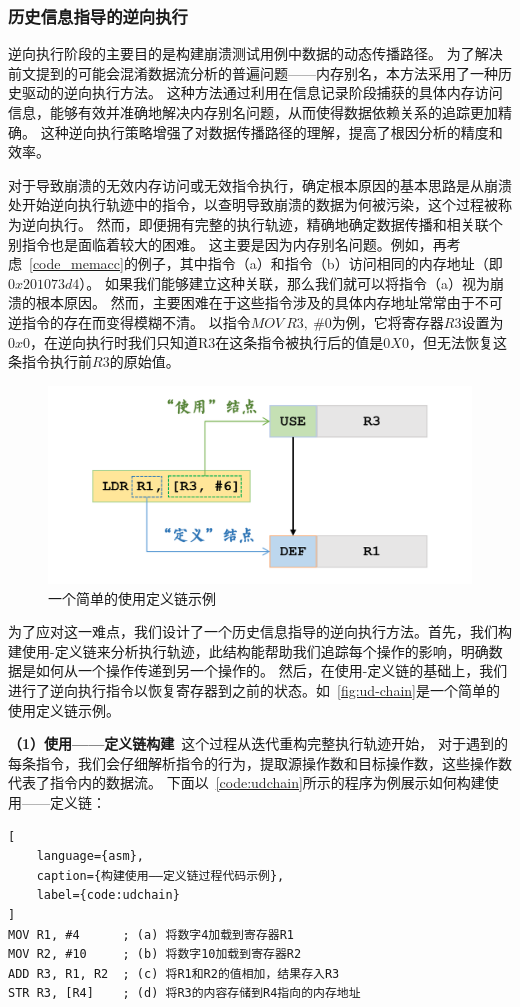 \subsubsection{历史信息指导的逆向执行}
逆向执行阶段的主要目的是构建崩溃测试用例中数据的动态传播路径。
为了解决前文提到的可能会混淆数据流分析的普遍问题——内存别名，本方法采用了一种历史驱动的逆向执行方法。
这种方法通过利用在信息记录阶段捕获的具体内存访问信息，能够有效并准确地解决内存别名问题，从而使得数据依赖关系的追踪更加精确。
这种逆向执行策略增强了对数据传播路径的理解，提高了根因分析的精度和效率。

对于导致崩溃的无效内存访问或无效指令执行，确定根本原因的基本思路是从崩溃处开始逆向执行轨迹中的指令，以查明导致崩溃的数据为何被污染，这个过程被称为逆向执行。
然而，即便拥有完整的执行轨迹，精确地确定数据传播和相关联个别指令也是面临着较大的困难。
这主要是因为内存别名问题。例如，再考虑~\autoref{code_memacc}的例子，其中指令（a）和指令（b）访问相同的内存地址（即$0x201073d4$）。
如果我们能够建立这种关联，那么我们就可以将指令（a）视为崩溃的根本原因。
然而，主要困难在于这些指令涉及的具体内存地址常常由于不可逆指令的存在而变得模糊不清。
以指令$MOV\ R3,\ \#0$为例，它将寄存器$R3$设置为$0x0$，在逆向执行时我们只知道R3在这条指令被执行后的值是$0X0$，但无法恢复这条指令执行前$R3$的原始值。

\begin{figure}[h]
    \centering
    \includegraphics[width=1.0\textwidth]{./figure/UD-Chain.png}
    \caption{一个简单的使用定义链示例}
    \label{fig:ud-chain}
\end{figure}

为了应对这一难点，我们设计了一个历史信息指导的逆向执行方法。首先，我们构建使用-定义链来分析执行轨迹，此结构能帮助我们追踪每个操作的影响，明确数据是如何从一个操作传递到另一个操作的。
然后，在使用-定义链的基础上，我们进行了逆向执行指令以恢复寄存器到之前的状态。如~\autoref{fig:ud-chain}是一个简单的使用定义链示例。

\textbf{（1）使用——定义链构建}\ 这个过程从迭代重构完整执行轨迹开始，
对于遇到的每条指令，我们会仔细解析指令的行为，提取源操作数和目标操作数，这些操作数代表了指令内的数据流。
下面以~\autoref{code:udchain}所示的程序为例展示如何构建使用——定义链：
\begin{lstlisting}[
    language={asm},
    caption={构建使用——定义链过程代码示例},
    label={code:udchain}
]
MOV R1, #4      ; (a) 将数字4加载到寄存器R1
MOV R2, #10     ; (b) 将数字10加载到寄存器R2
ADD R3, R1, R2  ; (c) 将R1和R2的值相加，结果存入R3
STR R3, [R4]    ; (d) 将R3的内容存储到R4指向的内存地址
\end{lstlisting}

